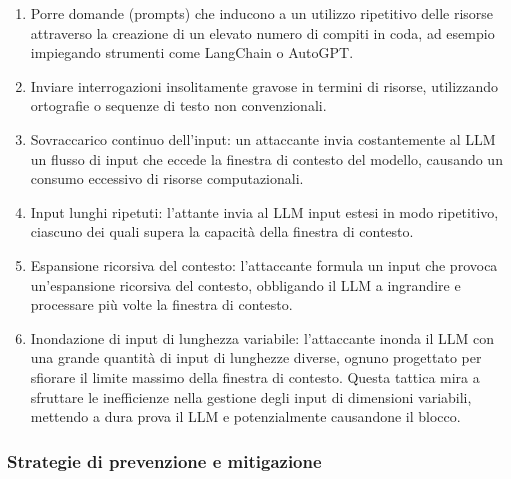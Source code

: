 \documentclass[
]{article}
\providecommand{\tightlist}{%
  \setlength{\itemsep}{0pt}\setlength{\parskip}{0pt}}
\begin{document}
\begin{enumerate}
\def\labelenumi{\arabic{enumi}.}
\tightlist
\item
  Porre domande (prompts) che inducono a un utilizzo ripetitivo delle
  risorse attraverso la creazione di un elevato numero di compiti in
  coda, ad esempio impiegando strumenti come LangChain o AutoGPT.
\item
  Inviare interrogazioni insolitamente gravose in termini di risorse,
  utilizzando ortografie o sequenze di testo non convenzionali.
\item
  Sovraccarico continuo dell'input: un attaccante invia costantemente al
  LLM un flusso di input che eccede la finestra di contesto del modello,
  causando un consumo eccessivo di risorse computazionali.
\item
  Input lunghi ripetuti: l'attante invia al LLM input estesi in modo
  ripetitivo, ciascuno dei quali supera la capacità della finestra di
  contesto.
\item
  Espansione ricorsiva del contesto: l'attaccante formula un input che
  provoca un'espansione ricorsiva del contesto, obbligando il LLM a
  ingrandire e processare più volte la finestra di contesto.
\item
  Inondazione di input di lunghezza variabile: l'attaccante inonda il
  LLM con una grande quantità di input di lunghezze diverse, ognuno
  progettato per sfiorare il limite massimo della finestra di contesto.
  Questa tattica mira a sfruttare le inefficienze nella gestione degli
  input di dimensioni variabili, mettendo a dura prova il LLM e
  potenzialmente causandone il blocco.
\end{enumerate}

\subsubsection{Strategie di prevenzione e
mitigazione}\label{strategie-di-prevenzione-e-mitigazione}
\end{document}
